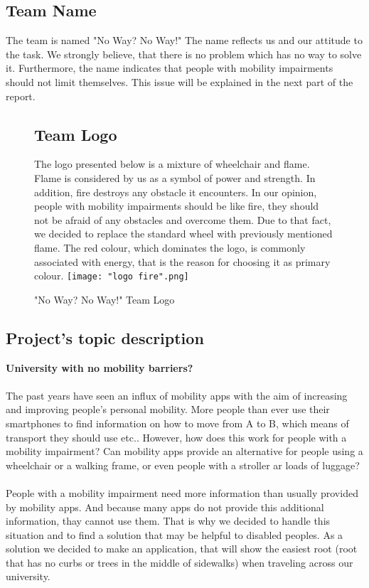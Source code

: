 \documentclass[12pt]{article}
\begin{document}
\subsection{Team Name}
The team is named "No Way? No Way!" The name reflects us and our attitude to the task. We strongly believe, that there is no problem which has no way to solve it. Furthermore, the name indicates that people with mobility impairments should not limit themselves. This issue will be explained in the next part of the report.

\newpage

\begin{figure}[H]
\subsection{Team Logo}
The logo presented below is a mixture of wheelchair and flame. Flame is considered by us as a symbol of power and strength. In addition, fire destroys any obstacle it encounters. In our opinion, people with mobility impairments should be like fire, they should not be afraid of any obstacles and overcome them. Due to that fact, we decided to replace the standard wheel with previously mentioned flame. The red colour, which dominates the logo, is commonly associated with energy, that is the reason for choosing it as primary colour.
\texttt{[image: "logo fire".png]}
\caption{"No Way? No Way!" Team Logo}
\label{fig:logo}
\end{figure}

\subsection{Project's topic description}
\textbf{University with no mobility barriers?} \\\\
The past years have seen an influx of mobility apps with the aim of increasing and improving people's personal mobility. More people than ever use their smartphones to find information on how to move from A to B, which means of transport they should use etc.. However, how does this work for people with a mobility impairment? Can mobility apps provide an alternative for people using a wheelchair or a walking frame, or even people with a stroller ar loads of luggage?\\\\
People with a mobility impairment need more information than usually provided by mobility apps. And because many apps do not provide this additional information, thay cannot use them. That is why we decided to handle this situation and to find a solution that may be helpful to disabled peoples.
As a solution we decided to make an application, that will show the easiest root (root that has no curbs or trees in the middle of sidewalks) when traveling across our university. 
\end{document}
